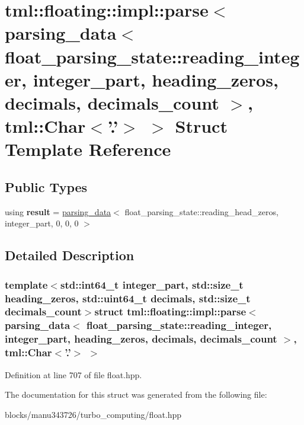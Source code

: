 \hypertarget{structtml_1_1floating_1_1impl_1_1parse_3_01parsing__data_3_01float__parsing__state_1_1reading__i0ac0110b7afe5f148cad01e9cc1fc61a}{\section{tml\+:\+:floating\+:\+:impl\+:\+:parse$<$ parsing\+\_\+data$<$ float\+\_\+parsing\+\_\+state\+:\+:reading\+\_\+integer, integer\+\_\+part, heading\+\_\+zeros, decimals, decimals\+\_\+count $>$, tml\+:\+:Char$<$'.'$>$ $>$ Struct Template Reference}
\label{structtml_1_1floating_1_1impl_1_1parse_3_01parsing__data_3_01float__parsing__state_1_1reading__i0ac0110b7afe5f148cad01e9cc1fc61a}
}
\subsection*{Public Types}
\begin{DoxyCompactItemize}
\item 
\hypertarget{structtml_1_1floating_1_1impl_1_1parse_3_01parsing__data_3_01float__parsing__state_1_1reading__i0ac0110b7afe5f148cad01e9cc1fc61a_a5dae6135fb79769cc385949ac36a8bc2}{using {\bfseries result} = \hyperlink{structtml_1_1floating_1_1impl_1_1parsing__data}{parsing\+\_\+data}$<$ float\+\_\+parsing\+\_\+state\+::reading\+\_\+head\+\_\+zeros, integer\+\_\+part, 0, 0, 0 $>$}\label{structtml_1_1floating_1_1impl_1_1parse_3_01parsing__data_3_01float__parsing__state_1_1reading__i0ac0110b7afe5f148cad01e9cc1fc61a_a5dae6135fb79769cc385949ac36a8bc2}

\end{DoxyCompactItemize}


\subsection{Detailed Description}
\subsubsection*{template$<$std\+::int64\+\_\+t integer\+\_\+part, std\+::size\+\_\+t heading\+\_\+zeros, std\+::uint64\+\_\+t decimals, std\+::size\+\_\+t decimals\+\_\+count$>$struct tml\+::floating\+::impl\+::parse$<$ parsing\+\_\+data$<$ float\+\_\+parsing\+\_\+state\+::reading\+\_\+integer, integer\+\_\+part, heading\+\_\+zeros, decimals, decimals\+\_\+count $>$, tml\+::\+Char$<$'.'$>$ $>$}



Definition at line 707 of file float.\+hpp.



The documentation for this struct was generated from the following file\+:\begin{DoxyCompactItemize}
\item 
blocks/manu343726/turbo\+\_\+computing/float.\+hpp\end{DoxyCompactItemize}
